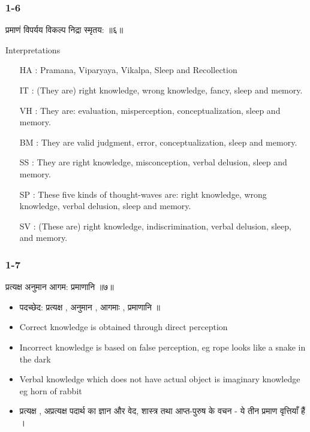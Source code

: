 \begin{frame}[fragile]\frametitle{1-6}

\begin{sanskrit}
 प्रमाणं विपर्यय विकल्प निद्रा स्मृतय: ॥६॥
\end{sanskrit}


Interpretations
\begin{itemize}	
\item [HA]: Pramana, Viparyaya, Vikalpa, Sleep and Recollection
\item [IT]: (They are) right knowledge, wrong knowledge, fancy, sleep and memory.
\item [VH]: They are: evaluation, misperception, conceptualization, sleep and memory.
\item [BM]: They are valid judgment, error, conceptualization, sleep and memory.
\item [SS]: They are right knowledge, misconception, verbal delusion, sleep and memory.
\item [SP]: These five kinds of thought-waves are: right knowledge, wrong knowledge, verbal delusion, sleep and memory.
\item [SV]: (These are) right knowledge, indiscrimination, verbal delusion, sleep, and memory.
\end{itemize}	

\end{frame}


\begin{frame}[fragile]\frametitle{1-7}

\begin{sanskrit}
प्रत्यक्ष अनुमान आगम: प्रमाणानि ॥७॥
\end{sanskrit}


\begin{itemize}
\item पदच्छेद: प्रत्यक्ष , अनुमान , आगमाः , प्रमाणानि ॥
\item Correct knowledge is obtained through direct perception
\item Incorrect knowledge is based on false perception, eg rope looks like a snake in the dark
\item Verbal knowledge which does not have actual object is imaginary knowledge eg horn of rabbit
\item प्रत्यक्ष , अप्रत्यक्ष पदार्थ का ज्ञान और वेद, शास्त्र तथा आप्त-पुरुष के वचन - ये तीन प्रमाण वृत्तियाँ हैं ।	
\end{itemize}

\end{frame}


